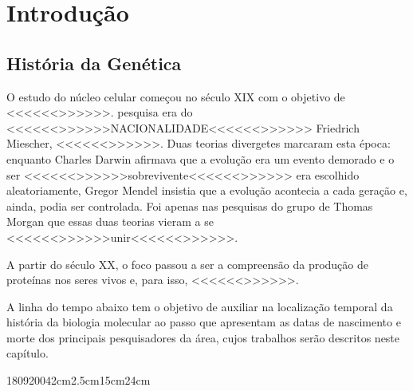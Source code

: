 \chapter{Introdução}

\section{História da Genética}

\indent O estudo do núcleo celular começou no século XIX com o objetivo de <<<<<<>>>>>>.  pesquisa era do <<<<<<>>>>>>NACIONALIDADE<<<<<<>>>>>> Friedrich Miescher, <<<<<<>>>>>>. Duas teorias divergetes marcaram esta época: enquanto Charles Darwin afirmava que a evolução era um evento demorado e o ser <<<<<<>>>>>>sobrevivente<<<<<<>>>>>> era escolhido aleatoriamente, Gregor Mendel insistia que a evolução acontecia a cada geração e, ainda, podia ser controlada. Foi apenas nas pesquisas do grupo de Thomas Morgan que essas duas teorias vieram a se <<<<<<>>>>>>unir<<<<<<>>>>>>.

A partir do século XX, o foco passou a ser a compreensão da produção de proteínas nos seres vivos e, para isso, <<<<<<>>>>>>.

\indent A linha do tempo abaixo tem o objetivo de auxiliar na localização temporal da história da biologia molecular ao passo que apresentam as datas de nascimento e morte dos principais pesquisadores da área, cujos trabalhos serão descritos neste capítulo. 


\begin{timeline}{1809}{2004}{2cm}{2.5cm}{15cm}{24cm}
\end{timeline}

